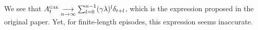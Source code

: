We see that $A^{\textsc{gae}}_t \underset{n \rightarrow \infty}{\longrightarrow} \sum_{l=0}^{n-1} (\gamma \lambda)^l \delta_{t+l}$, which is the expression proposed in the original paper. Yet, for finite-length episodes, this expression seems inaccurate.


